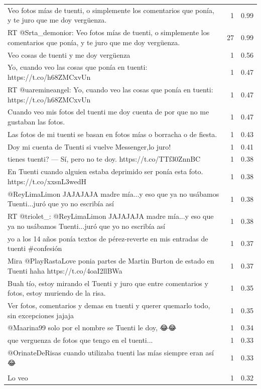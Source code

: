 \begin{longtable}{p{12.5cm}rr}
\bottomrule
\endlastfoot
Veo fotos mías de tuenti, o simplemente los comentarios que ponía, y te juro que me doy vergüenza. & 1 & 0.99 \\
RT @Srta\_demonior: Veo fotos mías de tuenti, o simplemente los comentarios que ponía, y te juro que me doy vergüenza. & 27 & 0.99 \\
Veo cosas de tuenti y me doy vergüenza & 1 & 0.56 \\
Yo, cuando veo las cosas que ponía en tuenti: https://t.co/h68ZMCxvUn & 1 & 0.47 \\
RT @uaremineangel: Yo, cuando veo las cosas que ponía en tuenti: https://t.co/h68ZMCxvUn & 1 & 0.47 \\
Cuando veo mis fotos del tuenti me doy cuenta de por que no me gustaban las fotos. & 1 & 0.47 \\
Las fotos de mi tuenti se basan en fotos mías o borracha o de fiesta. & 1 & 0.43 \\
Doy mi cuenta de Tuenti si vuelve Messenger,lo juro! & 1 & 0.41 \\
tienes tuenti? — Sí, pero no te doy. https://t.co/TTf30ZnnBC & 1 & 0.38 \\
En Tuenti cuando alguien estaba deprimido ser ponía esta foto. https://t.co/xxsnL3wedH & 1 & 0.38 \\
@ReyLimaLimon JAJAJAJA madre mía...y eso que ya no usábamos Tuenti...juró que yo no escribía así & 1 & 0.38 \\
RT @triolet\_: @ReyLimaLimon JAJAJAJA madre mía...y eso que ya no usábamos Tuenti...juró que yo no escribía así & 1 & 0.38 \\
yo a los 14 años ponía textos de pérez-reverte en mis entradas de tuenti \#confesión & 1 & 0.37 \\
Mira @PlayRastaLove ponia partes de Martin Burton de estado en Tuenti haha https://t.co/4oaI2llBWa & 1 & 0.37 \\
Buah tío, estoy mirando el Tuenti y juro que entre comentarios y fotos, estoy muriendo de la risa. & 1 & 0.35 \\
Ver fotos, comentarios y demas en tuenti y querer quemarlo todo, sin excepciones jajaja & 1 & 0.35 \\
@Maarina99 solo por el nombre se Tuenti le doy, 😂😂 & 1 & 0.34 \\
que verguenza de fotos que tengo en el tuenti... & 1 & 0.33 \\
@OrinateDeRisas cuando utilizaba tuenti las mías siempre eran así 😂 & 1 & 0.33 \\
\begin{tabular}[c]{@{}l@{}}En un futuro veremos los favs como ahora vemos tuenti.  \\ Lo veo\end{tabular} & 1 & 0.32 \\

\end{longtable}
\clearpage

